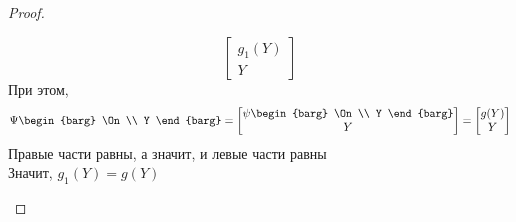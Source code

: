 \begin{proof}
\begin{enumerate}
$$\begin{bmatrix}
			g_1(Y) \\
			Y
		\end{bmatrix} $$
		При этом,
		$$ \Psi
		\begin{barg}
			\On \\
			Y
		\end{barg} =
		\begin{bmatrix}
			\psi
			\begin{barg}
				\On \\
				Y
			\end{barg} \\
			Y
		\end{bmatrix} =
		\begin{bmatrix}
			g(Y) \\
			Y
		\end{bmatrix} $$
		Правые части равны, а значит, и левые части равны \\
		Значит, $ g_1(Y) = g(Y) $
	\end{enumerate}
\end{proof}
